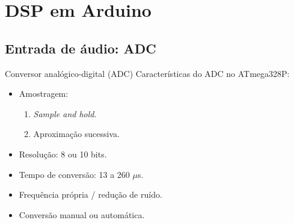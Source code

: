 \section{DSP em Arduino}


\subsection{Entrada de áudio: ADC}

\begin{frame}{Conversor analógico-digital (ADC)}
Características do ADC no ATmega328P:
\begin{itemize}
  \item Amostragem:
    \begin{enumerate}
      \item \emph{Sample and hold}.
      \item Aproximação sucessiva.
    \end{enumerate}
  \item Resolução: 8 ou 10 bits.
  \item Tempo de conversão: 13 a 260 $\mu$s.
  \item Frequência própria / redução de ruído.
  \item Conversão manual ou automática.
\end{itemize}
\end{frame}

